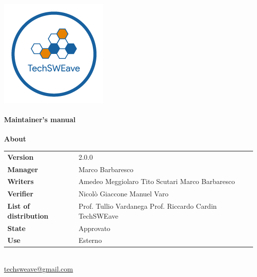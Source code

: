 \documentclass[a4paper]{article}
\begin{document}
\begin{titlepage}
    \begin{center}
        \includegraphics{../../../../Images/logo}\\
        \vspace{20px}
        \textcolor{logo}{\hrulefill}\\
        \vspace{20px}
        \textbf{\huge\textcolor{logo}{Maintainer's manual}}\\
        \vspace{10px}
        \textcolor{logo}{\hrulefill}\\
        \vspace{40px}
        \textbf{\Large About}\\
        \vspace{20px}
        \begin{tabular}{p{100px} | p{100px}}
            \textbf{Version}     & 2.0.0                                                                     \\
            \textbf{Manager} & Marco Barbaresco                                                              \\
            \textbf{Writers}    & Amedeo Meggiolaro \newline Tito Scutari \newline Marco Barbaresco          \\
            \textbf{Verifier} & Nicolò Giaccone \newline Manuel Varo                                      \\
            \textbf{List of distribution}  & Prof. Tullio Vardanega \newline Prof. Riccardo Cardin \newline TechSWEave \\
            \textbf{State}        & Approvato                                                                 \\
            \textbf{Use}          & Esterno                                                                   \\
        \end{tabular}\\
        \vspace{60px}
        \href{mailto:techsweave@gmail.com}{techsweave@gmail.com}\\

    \end{center}
\end{titlepage}
\end{document}
